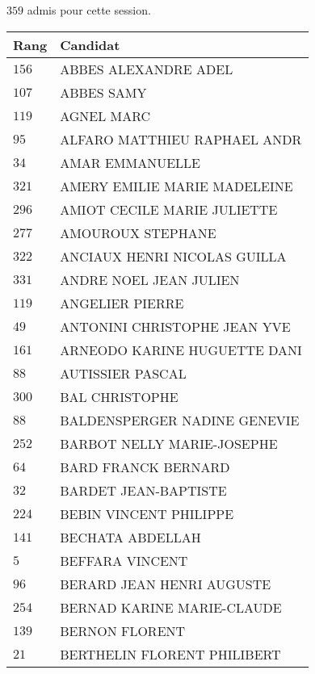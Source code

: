 



  $359$ admis pour cette session.

  \begin{xltabular}{\linewidth}{|l|X|}
    \hline
    \textbf{Rang} & \textbf{Candidat} \\
    \hline
    $156$ & ABBES ALEXANDRE ADEL \\
    \hline
    $107$ & ABBES SAMY \\
    \hline
    $119$ & AGNEL MARC \\
    \hline
    $95$ & ALFARO MATTHIEU RAPHAEL ANDR \\
    \hline
    $34$ & AMAR EMMANUELLE \\
    \hline
    $321$ & AMERY EMILIE MARIE MADELEINE \\
    \hline
    $296$ & AMIOT CECILE MARIE JULIETTE \\
    \hline
    $277$ & AMOUROUX STEPHANE \\
    \hline
    $322$ & ANCIAUX HENRI NICOLAS GUILLA \\
    \hline
    $331$ & ANDRE NOEL JEAN JULIEN \\
    \hline
    $119$ & ANGELIER PIERRE \\
    \hline
    $49$ & ANTONINI CHRISTOPHE JEAN YVE \\
    \hline
    $161$ & ARNEODO KARINE HUGUETTE DANI \\
    \hline
    $88$ & AUTISSIER PASCAL \\
    \hline
    $300$ & BAL CHRISTOPHE \\
    \hline
    $88$ & BALDENSPERGER NADINE GENEVIE \\
    \hline
    $252$ & BARBOT NELLY MARIE-JOSEPHE \\
    \hline
    $64$ & BARD FRANCK BERNARD \\
    \hline
    $32$ & BARDET JEAN-BAPTISTE \\
    \hline
    $224$ & BEBIN VINCENT PHILIPPE \\
    \hline
    $141$ & BECHATA ABDELLAH \\
    \hline
    $5$ & BEFFARA VINCENT \\
    \hline
    $96$ & BERARD JEAN HENRI AUGUSTE \\
    \hline
    $254$ & BERNAD KARINE MARIE-CLAUDE \\
    \hline
    $139$ & BERNON FLORENT \\
    \hline
    $21$ & BERTHELIN FLORENT PHILIBERT \\

\end{xltabular}

